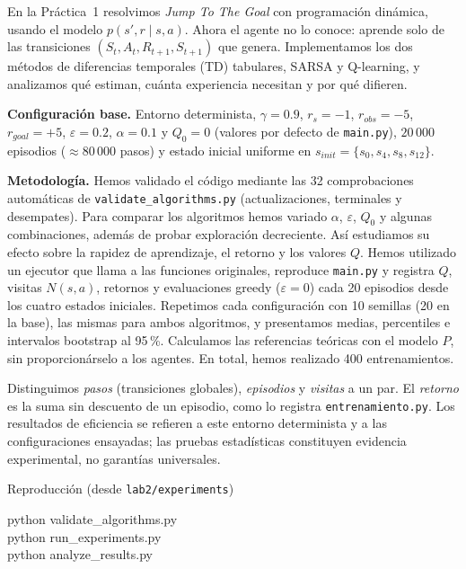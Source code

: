 \documentclass[11pt,a4paper]{article}
\begin{document}
En la Práctica~1 resolvimos \emph{Jump To The Goal} con programación dinámica, usando el modelo $p(s',r\mid s,a)$. Ahora el agente no lo conoce: aprende solo de las transiciones $(S_t,A_t,R_{t+1},S_{t+1})$ que genera. Implementamos los dos métodos de diferencias temporales (TD) tabulares, SARSA y Q-learning, y analizamos qué estiman, cuánta experiencia necesitan y por qué difieren.



\textbf{Configuración base.} Entorno determinista, $\gamma=0.9$, $r_s=-1$, $r_{obs}=-5$, $r_{goal}=+5$, $\varepsilon=0.2$, $\alpha=0.1$ y $Q_0=0$ (valores por defecto de \texttt{main.py}), $20\,000$ episodios ($\approx 80\,000$ pasos) y estado inicial uniforme en $s_{init}=\{s_0,s_4,s_8,s_{12}\}$.



\textbf{Metodología.} Hemos validado el código mediante las 32 comprobaciones automáticas de \texttt{validate\_\allowbreak algorithms.py} (actualizaciones, terminales y desempates). Para comparar los algoritmos hemos variado $\alpha$, $\varepsilon$, $Q_0$ y algunas combinaciones, además de probar exploración decreciente. Así estudiamos su efecto sobre la rapidez de aprendizaje, el retorno y los valores $Q$. Hemos utilizado un ejecutor que llama a las funciones originales, reproduce \texttt{main.py} y registra $Q$, visitas $N(s,a)$, retornos y evaluaciones greedy ($\varepsilon=0$) cada 20 episodios desde los cuatro estados iniciales. Repetimos cada configuración con 10 semillas (20 en la base), las mismas para ambos algoritmos, y presentamos medias, percentiles e intervalos bootstrap al 95\,\%. Calculamos las referencias teóricas con el modelo $P$, sin proporcionárselo a los agentes. En total, hemos realizado 400 entrenamientos.



Distinguimos \emph{pasos} (transiciones globales), \emph{episodios} y \emph{visitas} a un par. El \emph{retorno} es la suma sin descuento de un episodio, como lo registra \texttt{entrenamiento.py}. Los resultados de eficiencia se refieren a este entorno determinista y a las configuraciones ensayadas; las pruebas estadísticas constituyen evidencia experimental, no garantías universales.



\begin{comando}{Reproducción (desde \texttt{lab2/experiments})}

\ttfamily\small python validate\_algorithms.py\\ python run\_experiments.py\\ python analyze\_results.py

\end{comando}
\end{document}
